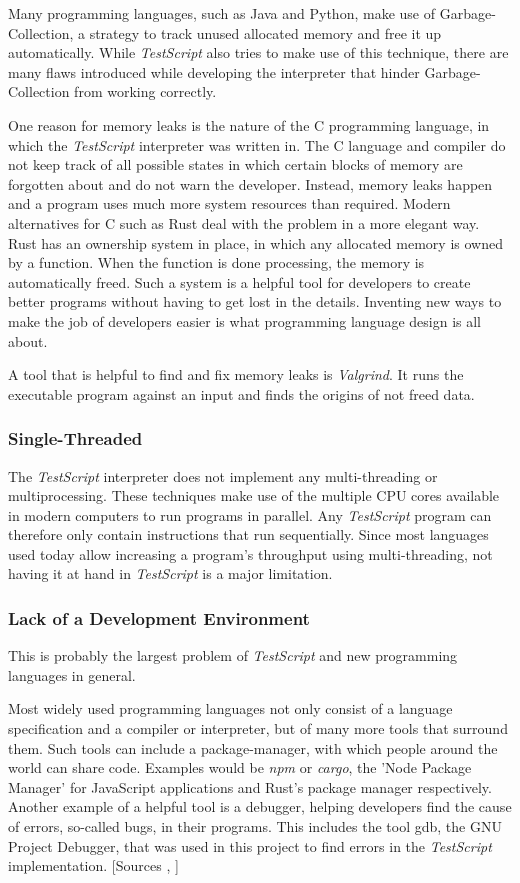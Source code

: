 \documentclass[12pt,a4paper]{article}
\newcommand{\name}{\emph{TestScript}}
\begin{document}
Many programming languages, such as Java and Python,
make use of Garbage-Collection, a strategy to track unused allocated memory and
free it up automatically. While \name{} also tries to make use of this technique,
there are many flaws introduced while developing the interpreter that hinder 
Garbage-Collection from working correctly.

One reason for memory leaks is the nature of the
C programming language, in which the \name{} interpreter was written in. The C language and
compiler do not keep track of all possible states in which certain blocks of memory are
forgotten about and do not warn the developer. Instead, memory leaks happen and a program
uses much more system resources than required.
Modern alternatives for C such as Rust deal with the problem in a more elegant way. 
Rust has an ownership system in place,
in which any allocated memory is owned by a function. When the function
is done processing, the memory is automatically freed. Such a system
is a helpful tool for developers to create better programs without having to get
lost in the details.
Inventing new ways to make the job of developers easier is what programming
language design is all about.

A tool that is helpful to find and fix memory leaks is \emph{Valgrind}. It runs
the executable program against an input and finds the origins of not freed data.

\subsubsection{Single-Threaded}
The \name{} interpreter does not implement any multi-threading or multiprocessing.
These techniques make use of the multiple CPU cores available in modern computers
to run programs in parallel.
Any \name{} program can therefore
only contain instructions that run sequentially.
Since most languages used today allow increasing a
program's throughput using multi-threading, not having it at hand in \name{}
is a major limitation.

\subsubsection{Lack of a Development Environment}
This is probably the largest problem of \name{} and new programming
languages in general.

Most widely used programming languages not only consist
of a language specification and a compiler or interpreter, but of many more
tools that surround them.
Such tools can include a package-manager, with which people around the world
can share code. Examples would be \emph{npm} or \emph{cargo}, 
the 'Node Package Manager' for JavaScript applications and Rust's package 
manager respectively.
Another example of a helpful tool is a debugger, helping developers
find the cause of errors, so-called bugs, in their programs.
This includes the tool gdb, the GNU Project Debugger, that was used in this
project to find errors in the \name{} implementation.
[Sources , ]
\end{document}
